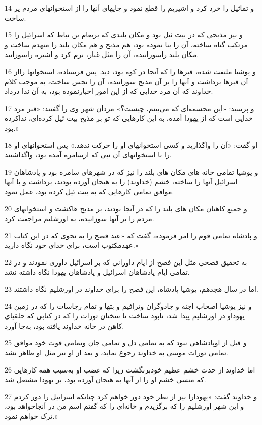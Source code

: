 \par 14 و تماثیل را خرد کرد و اشیریم را قطع نمود و جایهای آنها را از استخوانهای مردم پر ساخت.
\par 15 و نیز مذبحی که در بیت ئیل بود و مکان بلندی که یربعام بن نباط که اسرائیل را مرتکب گناه ساخته، آن را بنا نموده بود، هم مذبح و هم مکان بلند را منهدم ساخت و مکان بلند راسوزانیده، آن را مثل غبار، نرم کرد و اشیره راسوزانید.
\par 16 و یوشیا ملتفت شده، قبرها را که آنجا در کوه بود، دید. پس فرستاده، استخوانها رااز آن قبرها برداشت و آنها را بر آن مذبح سوزانیده، آن را نجس ساخت، به موجب کلام خداوند که آن مرد خدایی که از این امور اخبارنموده بود، به آن ندا درداد.
\par 17 و پرسید: «این مجسمه‌ای که می‌بینم، چیست؟» مردان شهر وی را گفتند: «قبر مرد خدایی است که از یهودا آمده، به این کارهایی که تو بر مذبح بیت ئیل کرده‌ای، نداکرده بود.»
\par 18 او گفت: «آن را واگذارید و کسی استخوانهای او را حرکت ندهد.» پس استخوانهای او را با استخوانهای آن نبی که ازسامره آمده بود، واگذاشتند.
\par 19 و یوشیا تمامی خانه های مکان های بلند را نیز که در شهرهای سامره بود و پادشاهان اسرائیل آنها را ساخته، خشم (خداوند) را به هیجان آورده بودند، برداشت و با آنها موافق تمامی کارهایی که به بیت ئیل کرده بود، عمل نمود.
\par 20 و جمیع کاهنان مکان های بلند را که در آنجا بودند، بر مذبح هاکشت و استخوانهای مردم را بر آنها سوزانیده، به اورشلیم مراجعت کرد.
\par 21 و پادشاه تمامی قوم را امر فرموده، گفت که «عید فصح را به نحوی که در این کتاب عهدمکتوب است، برای خدای خود نگاه دارید.»
\par 22 به تحقیق فصحی مثل این فصح از ایام داورانی که بر اسرائیل داوری نمودند و در تمامی ایام پادشاهان اسرائیل و پادشاهان یهودا نگاه داشته نشد.
\par 23 اما در سال هجدهم، یوشیا پادشاه، این فصح را برای خداوند در اورشلیم نگاه داشتند.
\par 24 و نیز یوشیا اصحاب اجنه و جادوگران وترافیم و بتها و تمام رجاسات را که در زمین یهوداو در اورشلیم پیدا شد، نابود ساخت تا سخنان تورات را که در کتابی که حلقیای کاهن در خانه خداوند یافته بود، به‌جا آورد.
\par 25 و قبل از اوپادشاهی نبود که به تمامی دل و تمامی جان وتمامی قوت خود موافق تمامی تورات موسی به خداوند رجوع نماید، و بعد از او نیز مثل او ظاهر نشد.
\par 26 اما خداوند از حدت خشم عظیم خودبرنگشت زیرا که غضب او به‌سبب همه کارهایی که منسی خشم او را از آنها به هیجان آورده بود، بر یهودا مشتعل شد.
\par 27 و خداوند گفت: «یهودارا نیز از نظر خود دور خواهم کرد چنانکه اسرائیل را دور کردم و این شهر اورشلیم را که برگزیدم و خانه‌ای را که گفتم اسم من در آنجاخواهد بود، ترک خواهم نمود.»
